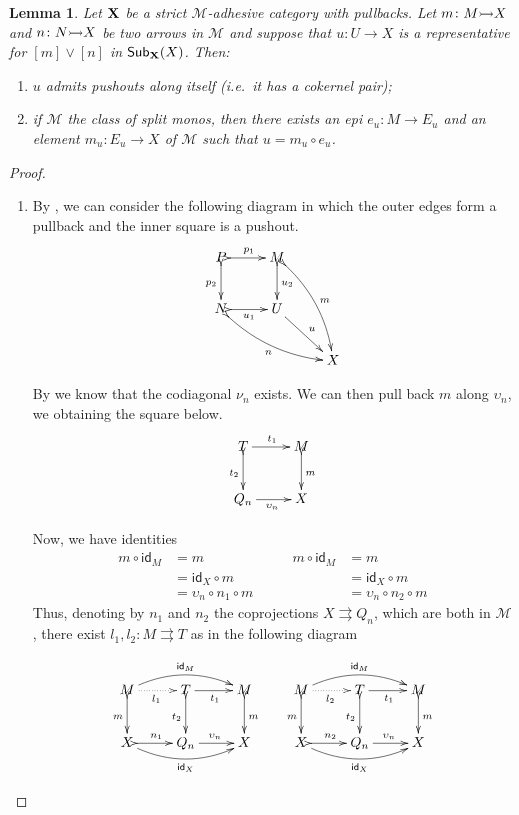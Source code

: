 \documentclass[a4paper]{article}
\newcommand{\msub}[2]{\mathsf{Sub}_{\textbf {\textup{#1}}}(#2)}
\newcommand{\id}[1]{\mathsf{id}_{#1}}
\newcommand{\mto}[0]{\scalebox{1}{$\rightarrowtail$}}
\def\X{\textbf {\textup{X}}}
\newtheorem{lemma}[theorem]{Lemma}
\theoremstyle{definition}
\begin{document}
\begin{lemma}\label{lem:fact2}
	Let $\X$ be a strict $\mathcal{M}$-adhesive category with pullbacks. Let $m\colon M\mto X$ and $n\colon N\mto X$ be two arrows in $\mathcal{M}$ and suppose that $u\colon U\to X$ is a representative for $[m]\vee[n]$ in $\msub{X}{X}$. Then:
	\begin{enumerate}
		\item $u$ admits pushouts  along itself (i.e.~it has a \emph{cokernel pair}); 
		\item if $\mathcal{M}$ the class of split monos, then there exists an epi $e_u\colon M\to E_u$ and an element $m_u\colon  E_u\to X$ of $\mathcal{M}$ such that   $u=m_u\circ e_u$.
	\end{enumerate}
\end{lemma}

\begin{proof}
	\begin{enumerate}
		\item 
		By , we can consider the following diagram	in which the outer edges form a pullback and the inner square is a pushout.
		\[\xymatrix{P \ar@{>->}[r]^{p_1} \ar@{>->}[d]_{p_2} & M\ar@{>->}[d]^{u_2} \ar@{>->}@/^.3cm/[ddr]^{m} \\ N \ar@{>->}@/_.3cm/[drr]_{n}\ar@{>->}[r]_{u_1} & U \ar[dr]^{u} \\ && X}\]
		
		By  we know that the codiagonal $\nu_n$ exists. We can then pull back $m$ along $\upsilon_n$, we obtaining the square below.
		\[\xymatrix{T\ar[r]^{t_1}  \ar@{>->}[d]_{t_2}& M\ar@{>->}[d]^{m}\\ Q_{n} \ar[r]_{\upsilon_n} & X}\]
	
		Now, we have identities
		\[\begin{split}
			m \circ \id{M}&=m \\&=\id{X} \circ  m \\&=\upsilon_n\circ n_1 \circ m
		\end{split} \qquad \begin{split}
			m \circ \id{M}&=m \\&=\id{X} \circ  m \\&=\upsilon_n\circ n_2\circ m
		\end{split}\]
		Thus, denoting by $n_1$ and $n_2$ the coprojections $X\rightrightarrows Q_n$, which are both in $\mathcal{M}$, there exist $l_1, l_2\colon M\rightrightarrows T$ as in the following diagram
		
			\[\xymatrix{ M\ar@{.>}[r]_{l_1} \ar@/^.4cm/[rr]^{\id{M}} \ar@{>->}[d]_{m}&T\ar[r]_{t_1}  \ar@{>->}[d]_{t_2}& M\ar@{>->}[d]^{m} & M\ar@{.>}[r]_{l_2} \ar@/^.4cm/[rr]^{\id{M}} \ar@{>->}[d]_{m}&T\ar[r]_{t_1}  \ar@{>->}[d]_{t_2}& M\ar@{>->}[d]^{m}\\ X  \ar@/_.4cm/[rr]_{\id{X}} \ar@{>->}[r]^{n_1}&Q_{n} \ar[r]^{\upsilon_n} & X & X \ar@/_.4cm/[rr]_{\id{X}} \ar@{>->}[r]^{n_2} &Q_{n} \ar[r]^{\upsilon_n} & X}\]
		

\end{enumerate}
\end{proof}
\end{document}

